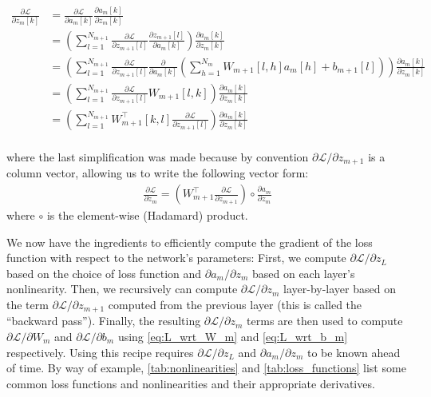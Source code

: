 \begin{align}
        \frac{\partial \mathcal{L}}{\partial z_m[k]} &= \frac{\partial \mathcal{L}}{\partial a_m[k]} \frac{\partial a_m[k]}{\partial z_m[k]}\\
                                                     &= \left(\sum_{l = 1}^{N_{m + 1}}\frac{\partial \mathcal{L}}{\partial z_{m + 1}[l]}\frac{\partial z_{m + 1}[l]}{\partial a_m[k]}\right)\frac{\partial a_m[k]}{\partial z_m[k]}\\
                                                     &= \left(\sum_{l = 1}^{N_{m + 1}}\frac{\partial \mathcal{L}}{\partial z_{m + 1}[l]}\frac{\partial}{\partial a_m[k]} \left(\sum_{h = 1}^{N_m} W_{m + 1}[l, h] a_m[h] + b_{m + 1}[l]\right)\right) \frac{\partial a_m[k]}{\partial z_m[k]}\\
                                                     &= \left(\sum_{l = 1}^{N_{m + 1}}\frac{\partial \mathcal{L}}{\partial z_{m + 1}[l]} W_{m + 1}[l, k]\right) \frac{\partial a_m[k]}{\partial z_m[k]}\\
                                                     &= \left(\sum_{l = 1}^{N_{m + 1}}W_{m + 1}^\top[k, l] \frac{\partial \mathcal{L}}{\partial z_{m + 1}[l]}\right) \frac{\partial a_m[k]}{\partial z_m[k]}\\
\end{align}

where the last simplification was made because by convention $\partial \mathcal{L}/\partial z_{m + 1}$ is a column vector, allowing us to write the following vector form:
\begin{align}
        \frac{\partial \mathcal{L}}{\partial z_m} = \left(W_{m + 1}^\top \frac{\partial \mathcal{L}}{\partial z_{m + 1}}\right) \circ \frac{\partial a_m}{\partial z_m}
\label{eq:L_wrt_z_m}
\end{align}
where $\circ$ is the element-wise (Hadamard) product.

We now have the ingredients to efficiently compute the gradient of the loss function with respect to the network's parameters: First, we compute $\partial \mathcal{L}/\partial z_L$ based on the choice of loss function and $\partial a_m/\partial z_m$ based on each layer's nonlinearity.
Then, we recursively can compute $\partial \mathcal{L}/\partial z_m$ layer-by-layer based on the term $\partial \mathcal{L}/\partial z_{m + 1}$ computed from the previous layer (this is called the ``backward pass'').
Finally, the resulting $\partial \mathcal{L}/\partial z_m$ terms are then used to compute $\partial \mathcal{L}/\partial W_m$ and $\partial \mathcal{L}/\partial b_m$ using \cref{eq:L_wrt_W_m} and \cref{eq:L_wrt_b_m} respectively.
Using this recipe requires $\partial \mathcal{L}/\partial z_L$ and $\partial a_m/\partial z_m$ to be known ahead of time.
By way of example, \cref{tab:nonlinearities} and \cref{tab:loss_functions} list some common loss functions and nonlinearities and their appropriate derivatives.

